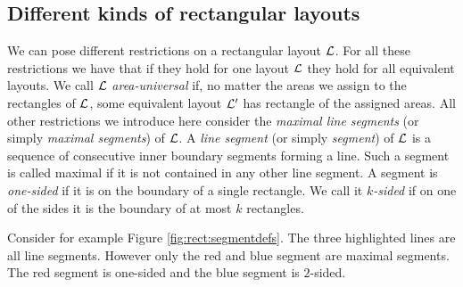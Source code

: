 \subsection{Different kinds of rectangular layouts}
  We can pose different restrictions on a rectangular layout $\mathcal{L}$. For all these restrictions we have that if they hold for one layout $\mathcal{L}$ they hold for all equivalent layouts.
  We call $\mathcal{L}$ \emph{area-universal} if, no matter the areas we assign to the rectangles of $\mathcal{L}$, some equivalent layout $\mathcal{L}'$ has rectangle of the assigned areas.
  All other restrictions we introduce here consider the \emph{maximal line segments} (or simply \emph{maximal segments}) of $\mathcal{L}$. A \emph{line segment} (or simply \emph{segment}) of $\mathcal{L}$ is a sequence of consecutive inner boundary segments forming a line. Such a segment is called maximal if it is not contained in any other line segment.
  A segment is \emph{one-sided} if it is on the boundary of a single rectangle. We call it \emph{$k$-sided} if on one of the sides it is the boundary of at most $k$ rectangles.

  Consider for example Figure \ref{fig:rect:segmentdefs}. The three highlighted lines are all line segments. However only the red and blue segment are maximal segments. The red segment is one-sided and the blue segment is $2$-sided.

